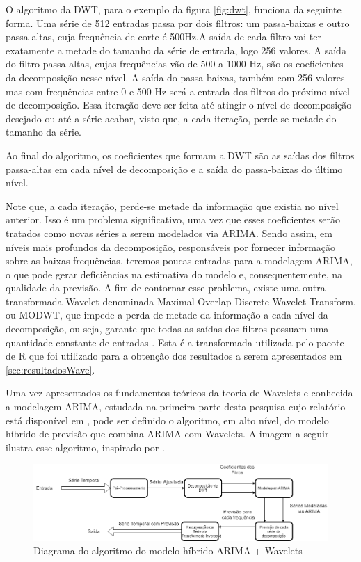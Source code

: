 \documentclass[12pt]{article}
\begin{document}
	O algoritmo da \textrm{DWT}, para o exemplo da figura \ref{fig:dwt}, funciona da seguinte forma. Uma série de 512 entradas passa por dois filtros: um passa-baixas e outro passa-altas, cuja frequência de corte é 500Hz.A saída de cada filtro vai ter exatamente a metade do tamanho da série de entrada, logo 256 valores. A saída do filtro passa-altas, cujas frequências vão de 500 a 1000 Hz, são os coeficientes da decomposição nesse nível. A saída do passa-baixas, também com 256 valores mas com frequências entre 0 e 500 Hz será a entrada dos filtros do próximo nível de decomposição. Essa iteração deve ser feita até atingir o nível de decomposição desejado ou até a série acabar, visto que, a cada iteração, perde-se metade do tamanho da série.
	
	Ao final do algoritmo, os coeficientes que formam a \textrm{DWT} são as saídas dos filtros passa-altas em cada nível de decomposição e a saída do passa-baixas do último nível.
	
	Note que, a cada iteração, perde-se metade da informação que existia no nível anterior. Isso é um problema significativo, uma vez que esses coeficientes serão tratados como novas séries a serem modelados via ARIMA. Sendo assim, em níveis mais profundos da decomposição, responsáveis por fornecer informação sobre as baixas frequências, teremos poucas entradas para a modelagem ARIMA, o que pode gerar deficiências na estimativa do modelo e, consequentemente, na qualidade da previsão. A fim de contornar esse problema, existe uma outra transformada \textrm{Wavelet} denominada \textrm{Maximal Overlap Discrete Wavelet Transform}, ou MODWT, que impede a perda de metade da informação a cada nível da decomposição, ou seja, garante que todas as saídas dos filtros possuam uma quantidade constante de entradas \cite{WaveARIMA}. Esta é a transformada utilizada pelo pacote de R que foi utilizado para a obtenção dos resultados a serem apresentados em \ref{sec:resultadosWave}.
	
	Uma vez apresentados os fundamentos teóricos da teoria de \textrm{Wavelets} e conhecida a modelagem ARIMA, estudada na primeira parte desta pesquisa cujo relatório está disponível em \cite{git}, pode ser definido o algoritmo, em alto nível, do modelo híbrido de previsão que combina ARIMA com \textrm{Wavelets}. A imagem a seguir ilustra esse algoritmo, inspirado por \cite{WaveARIMA}.
	\begin{figure}[H]
		\centering
		\includegraphics[width=1.0\linewidth]{Imagens/diagramaModeloHibrido}
		\caption{Diagrama do algoritmo do modelo híbrido ARIMA + Wavelets}
		\label{fig:diagramawaveletsARIMA}
	\end{figure}
	
\end{document}
